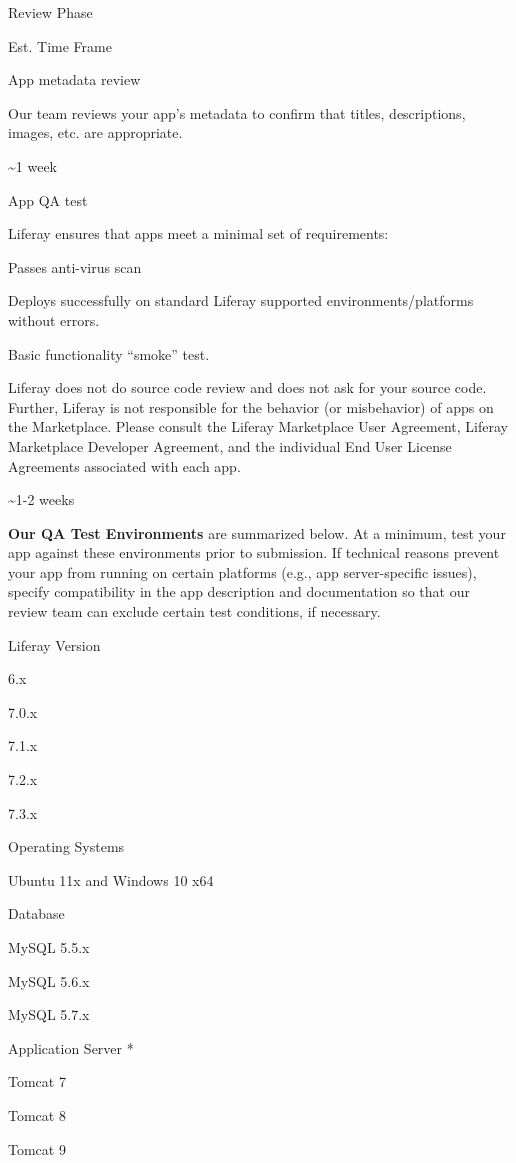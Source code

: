 \label{article-33460874}
Review Phase

Est. Time Frame

App metadata review

Our team reviews your app's metadata to confirm that titles,
descriptions, images, etc. are appropriate.

\textasciitilde1 week

App QA test

Liferay ensures that apps meet a minimal set of requirements:

Passes anti-virus scan

Deploys successfully on standard Liferay supported
environments/platforms without errors.

Basic functionality ``smoke'' test.

Liferay does not do source code review and does not ask for your source
code. Further, Liferay is not responsible for the behavior (or
misbehavior) of apps on the Marketplace. Please consult the Liferay
Marketplace User Agreement, Liferay Marketplace Developer Agreement, and
the individual End User License Agreements associated with each app.

\textasciitilde1-2 weeks

\textbf{Our QA Test Environments} are summarized below. At a minimum,
test your app against these environments prior to submission. If
technical reasons prevent your app from running on certain platforms
(e.g., app server-specific issues), specify compatibility in the app
description and documentation so that our review team can exclude
certain test conditions, if necessary.

\label{article-33460919}
Liferay Version

6.x

7.0.x

7.1.x

7.2.x

7.3.x

Operating Systems

Ubuntu 11x and Windows 10 x64

Database

MySQL 5.5.x

MySQL 5.6.x

MySQL 5.7.x

Application Server *

Tomcat 7

Tomcat 8

Tomcat 9

